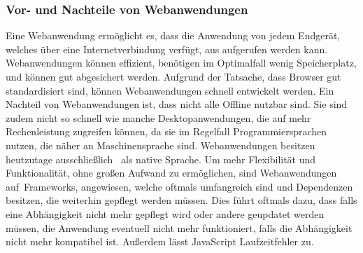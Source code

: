 \subsubsection{Vor- und Nachteile von Webanwendungen}
Eine Webanwendung ermöglicht es, dass die Anwendung von jedem Endgerät, welches über eine Internetverbindung verfügt, aus aufgerufen werden kann.
Webanwendungen können effizient, benötigen im Optimalfall wenig Speicherplatz, und können gut abgesichert werden.
Aufgrund der Tatsache, dass Browser gut standardisiert sind, können Webanwendungen schnell entwickelt werden.
\newline
\newline
Ein Nachteil von Webanwendungen ist, dass nicht alle Offline nutzbar sind.
Sie sind zudem nicht so schnell wie manche Desktopanwendungen, die auf mehr Rechenleistung zugreifen können, da sie im Regelfall Programmiersprachen nutzen, die näher an Maschinensprache sind.
Webanwendungen besitzen heutzutage ausschließlich~\cite{JavaScript} als native Sprache.
Um mehr Flexibilität und Funktionalität, ohne großen Aufwand zu ermöglichen, sind Webanwendungen auf~\gls{Frameworks}, angewiesen, welche oftmals umfangreich sind und Dependenzen besitzen, die weiterhin gepflegt werden müssen.
Dies führt oftmals dazu, dass falls eine Abhängigkeit nicht mehr gepflegt wird oder andere geupdatet werden müssen, die Anwendung eventuell nicht mehr funktioniert, falls die Abhängigkeit nicht mehr kompatibel ist.
Außerdem lässt JavaScript Laufzeitfehler zu.

